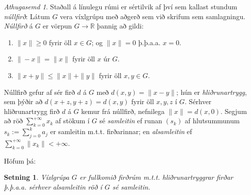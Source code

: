 \documentclass[a4paper,icelandic,11pt]{book}
\theoremstyle{plain}      \newtheorem{setn}{Setning}[chapter]
\theoremstyle{definition} \newtheorem{skilgr}[setn]{Skilgreining}
\theoremstyle{remark}     \newtheorem*{ath}{Athugasemd}
\newcommand{\R}{\mathbb R}
\begin{document}
\begin{ath}
  Staðall á línulegu rúmi er sértilvik af því sem kallast stundum
  \emph{núllfirð}: Látum $G$ vera víxlgrúpu með aðgerð sem við skrifum
  sem samlagningu. \emph{Núllfirð} á $G$ er
  vörpun $G\to\R$ þannig að gildi:
  \begin{enumerate}[(1)]
  \item $\|x\|\ge 0$ fyrir öll $x\in G$; og $\|x\|=0$ þ.þ.a.a. $x=0$.
  \item $\|-x\|=\|x\|$ fyrir öll $x$ úr $G$.
  \item $\|x+y\|\le\|x\|+\|y\|$ fyrir öll $x,y\in G$.
  \end{enumerate}
  Núllfirð gefur af sér firð $d$ á $G$ með $d(x,y)=\|x-y\|$; hún er
  \emph{hliðrunartrygg}, sem
  þýðir að $d(x+z,y+z)=d(x,y)$ fyrir öll $x,y,z$ í $G$. Sérhver
  hliðrunartrygg firð $d$ á $G$ kemur frá núllfirð, nefnilega
  $\|x\|=d(x,0)$. Segjum að röð $\sum_{k=0}^{+\infty}x_{k}$ af stökum
  í $G$ sé \emph{samleitin} ef runan $(s_{k})$ af hlutsummunum
  $s_{k}:=\sum_{j=0}^{k}a_{j}$ er samleitin m.t.t. firðarinnar; en
  \emph{alsamleitin} ef $\sum_{k=0}^{+\infty}\|x_{k}\|<+\infty$. 
\end{ath}
Höfum þá:
\begin{setn}
  Víxlgrúpa $G$ er fullkomið firðrúm m.t.t. hliðrunartryggrar firðar
  þ.þ.a.a. sérhver alsamleitin röð í $G$ sé samleitin.
\end{setn}
\end{document}
